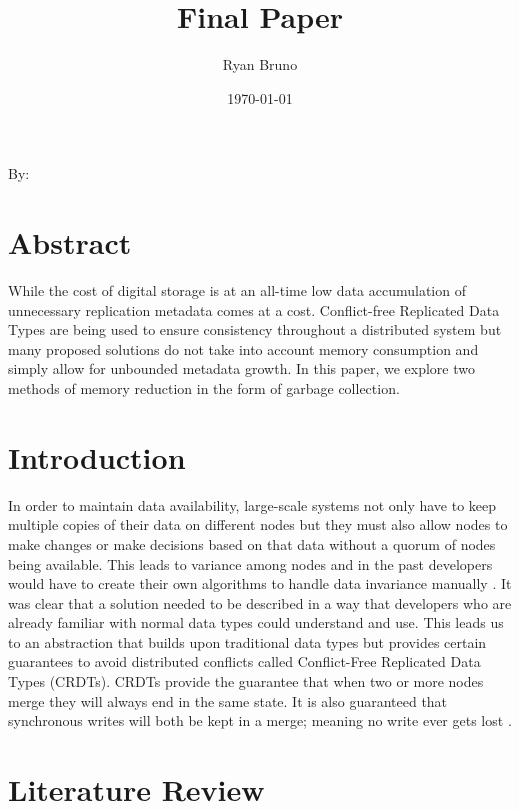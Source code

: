 \documentclass{article}
\title{Final Paper}
\author{Ryan Bruno}
\date{\today}
\renewcommand{\maketitle}{
    \begin{center}
        \Huge\textbf{\thetitle}
    \end{center}
    \begin{multicols}{2}
        \begin{flushright}
        By: \theauthor
        \end{flushright}

        \columnbreak
        
        \thedate
    \end{multicols}
}
\begin{document}
\maketitle

\begin{multicols}{2}
\begin{refsection}

\section*{Abstract}

While the cost of digital storage is at an all-time low data accumulation of unnecessary replication metadata comes at a cost. Conflict-free Replicated Data Types are being used to ensure consistency throughout a distributed system but many proposed solutions do not take into account memory consumption and simply allow for unbounded metadata growth. In this paper, we explore two methods of memory reduction in the form of garbage collection.

\section*{Introduction}

In order to maintain data availability, large-scale systems not only have to keep multiple copies of their data on different nodes but they must also allow nodes to make changes or make decisions based on that data without a quorum of nodes being available. This leads to variance among nodes and in the past developers would have to create their own algorithms to handle data invariance manually \cite{kleppmann_conflict-free_2017}. It was clear that a solution needed to be described in a way that developers who are already familiar with normal data types could understand and use. This leads us to an abstraction that builds upon traditional data types but provides certain guarantees to avoid distributed conflicts called Conflict-Free Replicated Data Types (CRDTs). CRDTs provide the guarantee that when two or more nodes merge they will always end in the same state. It is also guaranteed that synchronous writes will both be kept in a merge; meaning no write ever gets lost \cite{shapiro_comprehensive_2011}.

\section*{Literature Review}


\end{refsection}
\end{multicols}
\end{document}
